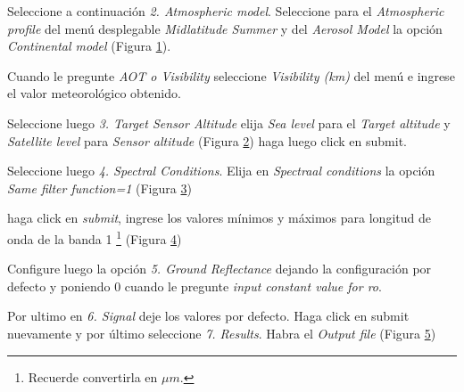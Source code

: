 Seleccione a continuación \emph{2. Atmospheric model}. Seleccione para el \emph{Atmospheric profile} del menú desplegable \emph{Midlatitude Summer} y del \emph{Aerosol Model}  la opción \emph{Continental model} (Figura \ref{fig:6satmo}).

\begin{figure}[h!]
    \centering
    \caption{}
    \label{fig:6satmo}
\end{figure}

Cuando le pregunte \emph{AOT o Visibility} seleccione \emph{Visibility (km)} del menú e ingrese el valor meteorológico obtenido.

Seleccione luego \emph{3. Target Sensor Altitude} elija \emph{Sea level} para el \emph{Target altitude} y \emph{Satellite level} para \emph{Sensor altitude} (Figura \ref{fig:6salt}) haga luego click en submit.

\begin{figure}[h!]
    \centering
    \caption{}
    \label{fig:6salt}
\end{figure}

Seleccione luego \emph{4. Spectral Conditions}. Elija en \emph{Spectraal conditions} la opción \emph{Same filter function=1} (Figura \ref{fig:6sspec})

\begin{figure}[h!]
    \centering
    \caption{}
    \label{fig:6sspec}
\end{figure}

haga click en \emph{submit}, ingrese los valores mínimos y máximos para longitud de onda de la banda 1 \footnote{Recuerde convertirla en $\mu m$.} (Figura \ref{fig:6smm})

\begin{figure}[h!]
    \centering
    \caption{}
    \label{fig:6smm}
\end{figure}

Configure luego la opción \emph{5. Ground Reflectance} dejando la configuración por defecto y poniendo $0$ cuando le pregunte \emph{input constant value for ro}.

Por ultimo en \emph{6. Signal} deje los valores por defecto. Haga click en submit nuevamente y por último seleccione \emph{7. Results}. Habra el \emph{Output file} (Figura \ref{fig:6sres})

\begin{figure}[h!]
    \centering
    \caption{}
    \label{fig:6sres}
\end{figure}

